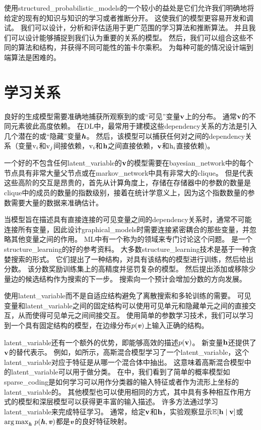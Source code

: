 使用\gls{structured_probabilistic_models}的一个较小的益处是它们允许我们明确地将给定的现有的知识与知识的学习或者推断分开。
这使我们的模型更容易开发和调试。 
我们可以设计，分析和评估适用于更广范围的学习算法和推断算法。
并且我们可以设计能够捕捉到我们认为重要的关系的模型。
然后，我们可以组合这些不同的算法和结构，并获得不同可能性的笛卡尔乘积。
为每种可能的情况设计端到端算法是困难的。



\section{学习关系}
\label{sec:learning_about_dependencies}

良好的生成模型需要准确地捕获所观察到的或``可见''变量$\mathbf{v}$上的分布。
通常$\mathbf{v}$的不同元素彼此高度依赖。
在\gls{DL}中，最常用于建模这些\gls{dependency}关系的方法是引入几个潜在的或``隐藏''变量$\boldsymbol{\mathit{h}}$。
然后，该模型可以捕获任何对之间的\gls{dependency}关系（变量$\mathrm{v}_i$和$\mathrm{v}_j$间接依赖，$\mathrm{v}_i$和$\mathbf{h}$之间直接依赖，$\mathbf{v}$和$\mathrm{h}_i$直接依赖)。

一个好的不包含任何\gls{latent_variable}的$\mathbf{v}$的模型需要在\gls{bayesian_network}中的每个节点具有非常大量父节点或在\gls{markov_network}中具有非常大的\gls{clique}。
但是代表这些高阶的交互是昂贵的，首先从计算角度上，存储在存储器中的参数的数量是\gls{clique}中的成员的数量的指数级别，接着在统计学意义上，因为这个指数数量的参数需要大量的数据来准确估计。


当模型旨在描述具有直接连接的可见变量之间的\gls{dependency}关系时，通常不可能连接所有变量，因此设计\gls{graphical_models}时需要连接紧密耦合的那些变量，并忽略其他变量之间的作用。
\gls{ML}中有一个称为的领域来专门讨论这个问题。
\citet{koller-book2009}是一个\gls{structure_learning}的好的参考资料。
大多数\gls{structure_learning}技术是基于一种贪婪搜索的形式。
它们提出了一种结构，对具有该结构的模型进行训练，然后给出分数。 
该分数奖励训练集上的高精度并惩罚复杂的模型。
然后提出添加或移除少量边的候选结构作为搜索的下一步。
搜索向一个预计会增加分数的方向发展。 


使用\gls{latent_variable}而不是自适应结构避免了离散搜索和多轮训练的需要。 
可见变量和\gls{latent_variable}之间的固定结构可以使用可见单元和隐藏单元之间的直接交互，从而使得可见单元之间间接交互。
使用简单的参数学习技术，我们可以学习到一个具有固定结构的模型，在边缘分布$p(\boldsymbol{\mathit{v}})$上输入正确的结构。


\gls{latent_variable}还有一个额外的优势，即能够高效的描述$p(\mathbf{v})$。
新变量$\mathbf{h}$还提供了$\mathbf{v}$的替代表示。
例如，如所示，高斯混合模型学习了一个\gls{latent_variable}，这个\gls{latent_variable}对应于特征是从哪一个混合体中抽出。
这意味着高斯混合模型中的\gls{latent_variable}可以用于做分类。
在中，我们看到了简单的概率模型如\gls{sparse_coding}是如何学习可以用作分类器的输入特征或者作为流形上坐标的\gls{latent_variable}的。
其他模型也可以使用相同的方式，其中具有多种相互作用方式的模型和深层模型可以获得更丰富的输入描述。
许多方法通过学习\gls{latent_variable}来完成特征学习。
通常，给定$\mathbf{v}$和$\mathbf{h}$，实验观察显示$\mathbb{E}[\mathbf{h}\mid\mathbf{v}]$或${\arg\max}_{\boldsymbol{\mathit{h}}}\ p(\boldsymbol{\mathit{h}},\boldsymbol{\mathit{v}})$都是$\boldsymbol{\mathit{v}}$的良好特征映射。

